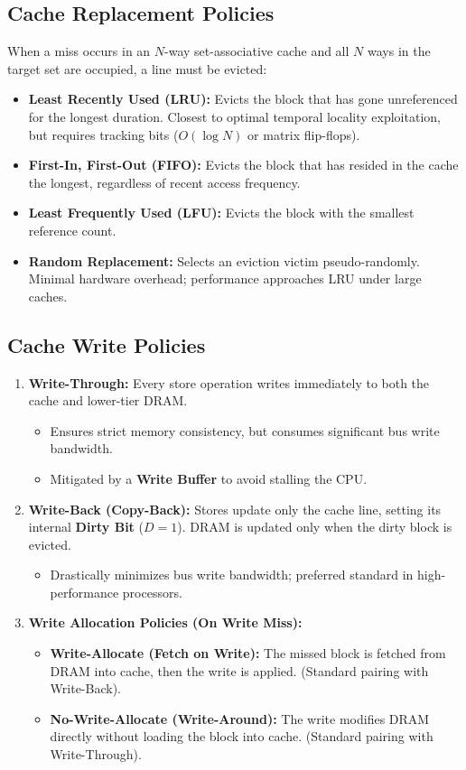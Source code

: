 \subsection{Cache Replacement Policies}
When a miss occurs in an $N$-way set-associative cache and all $N$ ways in the target set are occupied, a line must be evicted:
\begin{itemize}
    \item \textbf{Least Recently Used (LRU):} Evicts the block that has gone unreferenced for the longest duration. Closest to optimal temporal locality exploitation, but requires tracking bits ($O(\log N)$ or matrix flip-flops).
    \item \textbf{First-In, First-Out (FIFO):} Evicts the block that has resided in the cache the longest, regardless of recent access frequency.
    \item \textbf{Least Frequently Used (LFU):} Evicts the block with the smallest reference count.
    \item \textbf{Random Replacement:} Selects an eviction victim pseudo-randomly. Minimal hardware overhead; performance approaches LRU under large caches.
\end{itemize}

\subsection{Cache Write Policies}
\begin{enumerate}[label=\bfseries\arabic*.]
    \item \textbf{Write-Through:} Every store operation writes immediately to both the cache and lower-tier DRAM.
    \begin{itemize}
        \item Ensures strict memory consistency, but consumes significant bus write bandwidth.
        \item Mitigated by a \textbf{Write Buffer} to avoid stalling the CPU.
    \end{itemize}
    \item \textbf{Write-Back (Copy-Back):} Stores update only the cache line, setting its internal \textbf{Dirty Bit} ($D=1$). DRAM is updated only when the dirty block is evicted.
    \begin{itemize}
        \item Drastically minimizes bus write bandwidth; preferred standard in high-performance processors.
    \end{itemize}
    \item \textbf{Write Allocation Policies (On Write Miss):}
    \begin{itemize}
        \item \textbf{Write-Allocate (Fetch on Write):} The missed block is fetched from DRAM into cache, then the write is applied. (Standard pairing with Write-Back).
        \item \textbf{No-Write-Allocate (Write-Around):} The write modifies DRAM directly without loading the block into cache. (Standard pairing with Write-Through).
    \end{itemize}
\end{enumerate}


